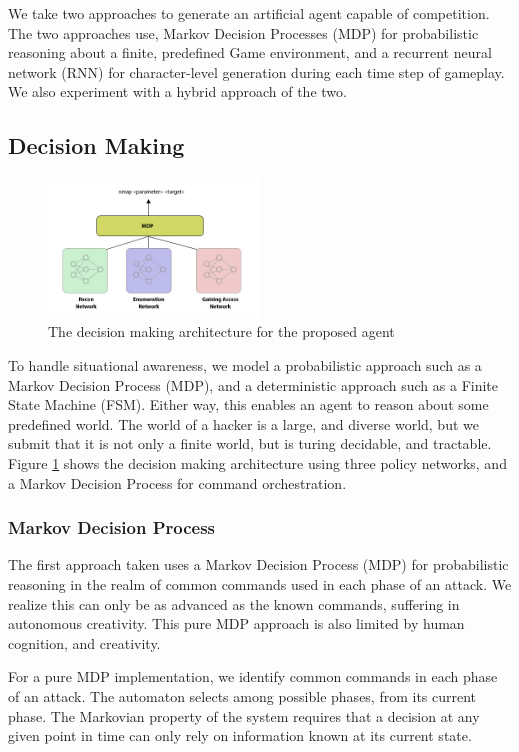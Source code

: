 \documentclass[10pt, titlepage, twocolumn]{article}
\newcommand{\ii}{\indent\indent}
\begin{document}
We take two approaches to generate an artificial agent capable of competition. The two approaches use, Markov Decision Processes (MDP) for probabilistic reasoning about a finite, predefined Game environment, and a recurrent neural network (RNN) for character-level generation during each time step of gameplay. We also experiment with a hybrid approach of the two.



\subsection{Decision Making}

\begin{figure}[H]
\centering
	\includegraphics[width=0.5\textwidth]{aiworld}
	\caption{The decision making architecture for the proposed agent}
	\label{aiworld}
\end{figure}

\ii
To handle situational awareness, we model a probabilistic approach such as a Markov Decision Process (MDP), and a deterministic approach such as a Finite State Machine (FSM). Either way, this enables an agent to reason about some predefined world. The world of a hacker is a large, and diverse world, but we submit that it is not only a finite world, but is turing decidable, and tractable. Figure \ref{aiworld} shows the decision making architecture using three policy networks, and a Markov Decision Process for command orchestration.


\subsubsection{Markov Decision Process}
\ii
The first approach taken uses a Markov Decision Process (MDP) for probabilistic reasoning in the realm of common commands used in each phase of an attack. We realize this can only be as advanced as the known commands, suffering in autonomous creativity. This pure MDP approach is also limited by human cognition, and creativity. 

For a pure MDP implementation, we identify common commands in each phase of an attack. The automaton selects among possible phases, from its current phase. The Markovian property of the system requires that a decision at any given point in time can only rely on information known at its current state. 
\end{document}
